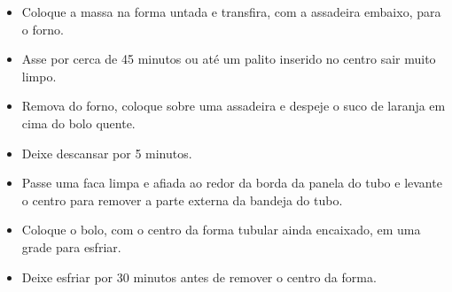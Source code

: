\documentclass [11pt, letterpaper] {article}
\newcommand \fileName {OrangeCake}
\begin{document}
\begin {description}
\begin {enumerate}
\begin {itemize}
\item Coloque a massa na forma untada e transfira, com a assadeira embaixo, para o forno.
\item Asse por cerca de 45 minutos ou até um palito inserido no centro sair muito limpo.
\item Remova do forno, coloque sobre uma assadeira e despeje o suco de laranja em cima do bolo quente.
\item Deixe descansar por 5 minutos.
\item Passe uma faca limpa e afiada ao redor da borda da panela do tubo e levante o centro para remover a parte externa da bandeja do tubo.
\item Coloque o bolo, com o centro da forma tubular ainda encaixado, em uma grade para esfriar.
\item Deixe esfriar por 30 minutos antes de remover o centro da forma.
\end {itemize}
\end {enumerate}
\end {description}


\end{document}
